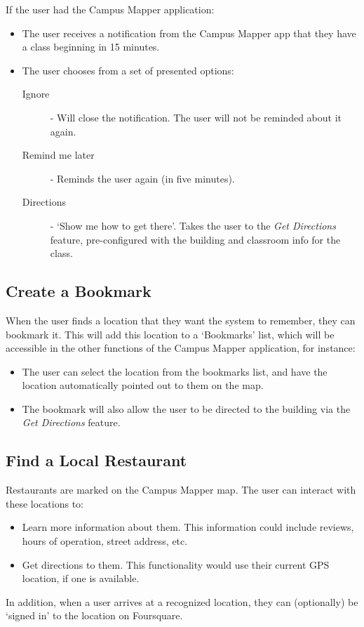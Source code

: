 \documentclass{article}
\begin{document}
If the user had the Campus Mapper application:
\begin{itemize}
\item The user receives a notification from the Campus Mapper app that they have
a class beginning in 15 minutes.
\item The user chooses from a set of presented options:
    \begin{description}
    \item[Ignore] - Will close the notification. The user will not be reminded
    about it again. 
    \item[Remind me later] - Reminds the user again (in five minutes).
    \item[Directions] - `Show me how to get there'. Takes the user to the \emph{Get
    Directions} feature, pre-configured with the building and classroom info for
    the class.
    \end{description}
\end{itemize}

\subsection{Create a Bookmark}
When the user finds a location that they want the system to remember, they can
bookmark it. This will add this location to a `Bookmarks' list, which will be
accessible in the other functions of the Campus Mapper application, for
instance:

\begin{itemize}
\item The user can select the location from the bookmarks list, and have the
location automatically pointed out to them on the map.
\item The bookmark will also allow the user to be directed to the building via
the \emph{Get Directions} feature.
\end{itemize}

\subsection{Find a Local Restaurant}
Restaurants are marked on the Campus Mapper map. The user can interact with
these locations to:
\begin{itemize}
\item Learn more information about them. This information could include reviews,
hours of operation, street address, etc.
\item Get directions to them. This functionality would use their current GPS
location, if one is available.
\end{itemize}
In addition, when a user arrives at a recognized location, they can (optionally)
be `signed in' to the location on Foursquare.
\end{document}

